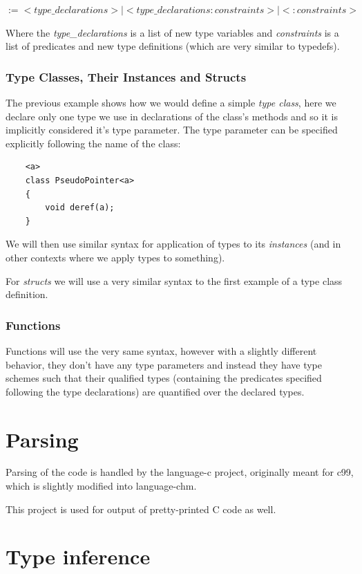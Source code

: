 $:= <type\_declarations> | <type\_declarations : constraints> | < : constraints >$

Where the \emph{type\_declarations} is a list of new type variables and \emph{constraints} is a list of predicates and new type definitions (which are very similar to typedefs).

\subsubsection{Type Classes, Their Instances and Structs}

The previous example shows how we would define a simple \emph{type class}, here we declare only one type we use in declarations of the class's methods and so it is implicitly considered it's type parameter. The type parameter can be specified explicitly following the name of the class:

\begin{lstlisting}
    <a>
    class PseudoPointer<a>
    {
        void deref(a);
    }
\end{lstlisting}

We will then use similar syntax for application of types to its \emph{instances} (and in other contexts where we apply types to something).

For \emph{structs} we will use a very similar syntax to the first example of a type class definition.

\subsubsection{Functions}

Functions will use the very same syntax, however with a slightly different behavior, they don't have any type parameters and instead they have type schemes such that their qualified types (containing the predicates specified following the type declarations) are quantified over the declared types.

\section{Parsing}

Parsing of the code is handled by the language-c project, originally meant for c99, which is slightly modified into language-chm. %

This project is used for output of pretty-printed C code as well.

\section{Type inference}

